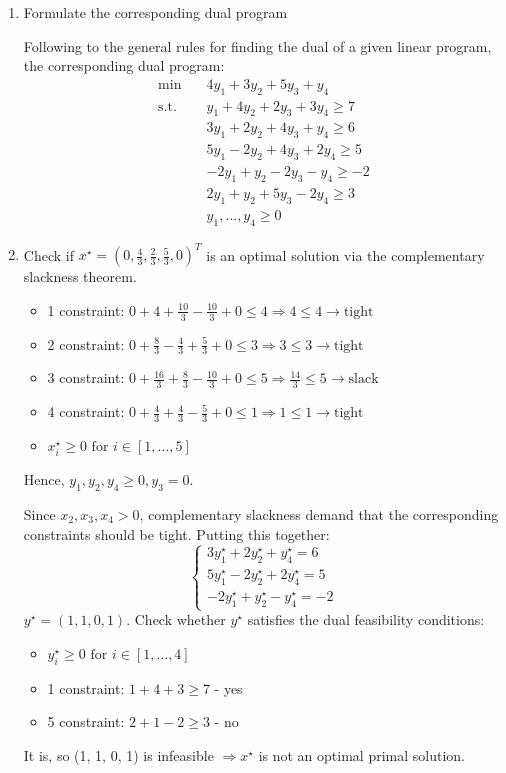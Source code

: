 \documentclass{homework}
\begin{document}
\begin{enumerate}[label=(\alph*)]
	\item Formulate the corresponding dual program

	Following to the general rules for finding the dual of a given linear program, the corresponding dual program:
	\begin{align*}
		\text{min} \quad
		&4y_1 + 3y_2 + 5y_3 + y_4\\
		\text{s.t.} \quad
		&y_1 + 4y_2 + 2y_3 + 3y_4\geq 7 \\
		&3y_1 + 2y_2 + 4y_3 + y_4\geq 6 \\
		&5y_1 - 2y_2 + 4y_3 + 2y_4\geq 5 \\
		&-2y_1 + y_2 - 2y_3 - y_4\geq -2 \\
		&2y_1 + y_2 +5 y_3 - 2y_4\geq 3 \\
		&y_1, \dots, y_4 \geq 0
	\end{align*}
	\item Check if $x^\star = (0, \frac{4}{3}, \frac{2}{3}, \frac{5}{3}, 0)^T$ is an optimal solution via the complementary slackness theorem.
	
	\begin{itemize}
	\item 1 constraint: $0 + 4 + \frac{10}{3} - \frac{10}{3} + 0 \leq 4 \Rightarrow 4 \leq 4 \rightarrow \text{tight}$
	\item 2 constraint: $0 + \frac{8}{3} - \frac{4}{3} + \frac{5}{3} + 0 \leq 3 \Rightarrow 3 \leq 3 \rightarrow \text{tight}$
	\item 3 constraint: $0 + \frac{16}{3} + \frac{8}{3} - \frac{10}{3} + 0 \leq 5 \Rightarrow \frac{14}{3} \leq 5 \rightarrow \text{slack}$
	\item 4 constraint: $0 + \frac{4}{3} + \frac{4}{3} - \frac{5}{3} + 0 \leq 1 \Rightarrow 1 \leq 1 \rightarrow \text{tight}$
	\item $x_i^\star \geq 0 \text{ for } i \in [1, \dots, 5]$
	\end{itemize}

	Hence, $y_1, y_2, y_4 \geq 0, y_3 = 0$.
	
	Since $x_2, x_3, x_4 > 0$, complementary slackness demand that the corresponding constraints should be tight. Putting this together:
	\[
	\begin{cases} 
		3y_1^\star + 2y_2^\star + y_4^\star = 6 \\
		5y_1^\star - 2y_2^\star + 2y_4^\star = 5 \\
		-2y_1^\star + y_2^\star - y_4^\star = -2 
	\end{cases}
	\]
	$y^\star = (1, 1, 0, 1)$.
	Check whether $y^\star$ satisfies the dual feasibility conditions:
	\begin{itemize}
	\item $y_i^\star \geq 0 \text{ for } i \in [1, \dots, 4]$
	\item 1 constraint: $1 + 4 + 3\geq 7$ - yes
	\item 5 constraint: $2 + 1 - 2\geq 3$ - no
	\end{itemize}
	It is, so (1, 1, 0, 1) is infeasible $\Rightarrow x^\star$ is not an optimal primal solution. 
	
\end{enumerate}
\end{document}
